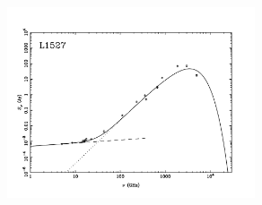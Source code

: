 \documentclass[9pt]{extarticle}   	%
\begin{document}
\begin{figure}[htbp]
\begin{center}
\includegraphics[width=0.65\textwidth]{plots/L1527.pdf}
\label{default}
\end{center}
\end{figure}

\clearpage
\end{document}
